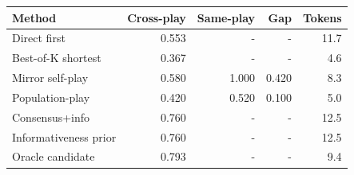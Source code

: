 \begin{tabular}{lrrrr}
\toprule
Method & Cross-play & Same-play & Gap & Tokens \\
\midrule
Direct first & 0.553 & - & - & 11.7 \\
Best-of-K shortest & 0.367 & - & - & 4.6 \\
Mirror self-play & 0.580 & 1.000 & 0.420 & 8.3 \\
Population-play & 0.420 & 0.520 & 0.100 & 5.0 \\
Consensus+info & 0.760 & - & - & 12.5 \\
Informativeness prior & 0.760 & - & - & 12.5 \\
Oracle candidate & 0.793 & - & - & 9.4 \\
\bottomrule
\end{tabular}
